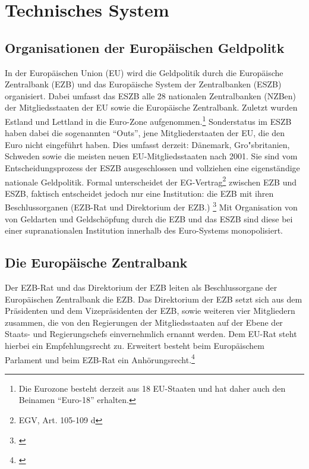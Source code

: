 \documentclass[
        onecolumn,
        a4paper,
        abstracton,
        parskip=half
        ,final
        ]{scrartcl}
\begin{document}
\section{Technisches System}
	\label{sec2:technischesSystem}



\subsection{Organisationen der Europ{\"a}ischen Geldpolitk}

In der Europ{\"a}ischen Union (EU) wird die Geldpolitik durch die Europ{\"a}ische Zentralbank (EZB) und das Europ{\"a}ische System der Zentralbanken (ESZB) organisiert. Dabei umfasst das ESZB alle 28 nationalen Zentralbanken (NZBen) der Mitgliedsstaaten der EU sowie die Europ{\"a}ische Zentralbank. Zuletzt wurden Estland und Lettland in die Euro-Zone aufgenommen.\footnote[98]{Die Eurozone besteht derzeit aus 18 EU-Staaten und hat daher auch den Beinamen "`Euro-18"' erhalten.} Sonderstatus im ESZB haben dabei die sogenannten "`Outs"', jene Mitgliederstaaten der EU, die den Euro nicht eingef{\"u}hrt haben.
Dies umfasst derzeit: D{\"a}nemark, Gro{"s}britanien, Schweden sowie die meisten neuen EU-Mitgliedsstaaten nach 2001. Sie sind vom Entscheidungsprozess der ESZB ausgeschlossen und vollziehen eine eigenst{\"a}ndige nationale Geldpolitik.
Formal unterscheidet der EG-Vertrag\footnote[25]{EGV, Art. 105-109 d} zwischen EZB und ESZB, faktisch entscheidet jedoch nur eine Institution: die EZB mit ihren Beschlussorganen (EZB-Rat und Direktorium der EZB.) \footnote[99]{\citep[vgl.][S.553]{Basseler2010}}
Mit Organisation von von Geldarten und Geldsch{\"o}pfung durch die EZB und das ESZB sind diese bei einer supranationalen Institution innerhalb des Euro-Systems monopolisiert.

\subsection{Die Europ{\"a}ische Zentralbank}
Der EZB-Rat und das Direktorium der EZB leiten als Beschlussorgane der Europ{\"a}ischen Zentralbank die EZB. Das Direktorium der EZB setzt sich aus dem Pr{\"a}sidenten und dem Vizepr{\"a}sidenten der EZB, sowie weiteren vier Mitgliedern zusammen, die von den Regierungen der Mitgliedsstaaten auf der Ebene der Staats- und Regierungschefs einvernehmlich ernannt werden. Dem EU-Rat steht hierbei ein Empfehlungsrecht zu. Erweitert besteht beim Europ{\"a}ischem Parlament und beim EZB-Rat ein Anh{\"o}rungsrecht.\footnote[46]{\citep[vgl.][S.553]{Basseler2010}}
\end{document}
